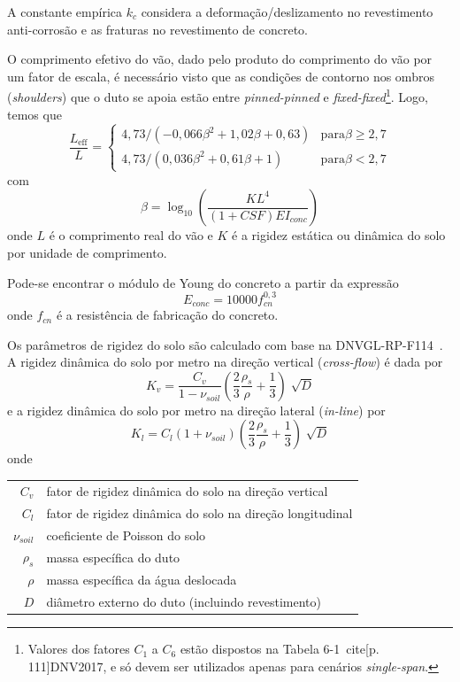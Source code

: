 A constante empírica $k_c$ considera a deformação/deslizamento no revestimento anti-corrosão e as fraturas no revestimento de concreto.

O comprimento efetivo do vão, dado pelo produto do comprimento do vão por um fator de escala, é necessário visto que as condições de contorno nos ombros (\textit{shoulders}) que o duto se apoia estão entre \textit{pinned-pinned} e \textit{fixed-fixed}\footnote{Valores dos fatores $C_1$ a $C_6$ estão dispostos na Tabela 6-1~cite[p. 111]{DNV2017}, e só devem ser utilizados apenas para cenários \textit{single-span}.}.
Logo, temos que
\begin{equation}
\label{eq:viv-LeffL}
\frac{L_\mathrm{eff}}{L} =
\begin{cases}
	4,73 / (-0,066 \beta^2 + 1,02 \beta + 0,63)   & \mathrm{para} \beta \geq 2,7 \\
	4,73 / (0,036 \beta^2 + 0,61 \beta + 1)       & \mathrm{para} \beta <    2,7
\end{cases}
\end{equation}
com
\begin{equation}
\label{eq:viv-beta}
\beta = \log_{10}\left( \frac{K L^4}{(1 + \mathit{CSF})\mathit{EI}_\mathit{conc}} \right)
\end{equation}
onde $L$ é o comprimento real do vão e $K$ é a rigidez estática ou dinâmica do solo por unidade de comprimento.

Pode-se encontrar o módulo de Young do concreto a partir da expressão
\begin{equation}
\label{eq:viv-Econc}
E_\mathit{conc} = 10000 f_\mathit{cn}^{0,3}
\end{equation}
onde $f_\mathit{cn}$ é a resistência de fabricação do concreto.

Os parâmetros de rigidez do solo são calculado com base na DNVGL-RP-F114~\cite{DNVF114}.
A rigidez dinâmica do solo por metro na direção vertical (\textit{cross-flow}) é dada por
\begin{equation}
\label{eq:viv-Kv}
K_v = \frac{C_v}{1 - \nu_\mathit{soil}}\left(\frac{2}{3}\frac{\rho_s}{\rho}+\frac{1}{3}\right)\sqrt[]{D}
\end{equation}
e a rigidez dinâmica do solo por metro na direção lateral (\textit{in-line}) por
\begin{equation}
\label{eq:viv-Kl}
K_l = C_l (1+\nu_\mathit{soil})\left(\frac{2}{3}\frac{\rho_s}{\rho}+ \frac{1}{3}\right)\sqrt[]{D}
\end{equation}
onde

\begin{tabular}{rl}
	$C_v$               & fator de rigidez dinâmica do solo na direção vertical\\
	$C_l$               & fator de rigidez dinâmica do solo na direção longitudinal\\
	$\nu_\mathit{soil}$ & coeficiente de Poisson do solo\\
	$\rho_s$            & massa específica do duto\\
	$\rho$              & massa específica da água deslocada\\
	$D$                 & diâmetro externo do duto (incluindo revestimento)
\end{tabular}

